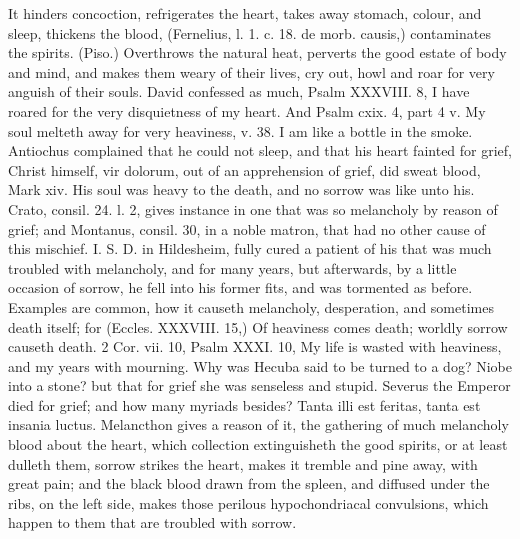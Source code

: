 {It hinders concoction, refrigerates the heart, takes away
stomach, colour, and sleep, thickens the blood, (Fernelius, l. 1.
c. 18. de morb. causis,) contaminates the spirits. (Piso.)
Overthrows the natural heat, perverts the good estate of body and mind,
and makes them weary of their lives, cry out, howl and roar for very
anguish of their souls. David confessed as much, Psalm XXXVIII. 8, I
have roared for the very disquietness of my heart. And Psalm cxix. 4,
part 4 v. My soul melteth away for very heaviness, v. 38. I am like a
bottle in the smoke. Antiochus complained that he could not sleep, and
that his heart fainted for grief, Christ himself, vir dolorum,
out of an apprehension of grief, did sweat blood, Mark xiv. His soul
was heavy to the death, and no sorrow was like unto his. Crato, consil.
24. l. 2, gives instance in one that was so melancholy by reason of
grief; and Montanus, consil. 30, in a noble matron, that
had no other cause of this mischief. I. S. D. in Hildesheim, fully
cured a patient of his that was much troubled with melancholy, and for
many years, but afterwards, by a little occasion of sorrow, he
fell into his former fits, and was tormented as before. Examples are
common, how it causeth melancholy, desperation, and sometimes
death itself; for (Eccles. XXXVIII. 15,) Of heaviness comes death;
worldly sorrow causeth death. 2 Cor. vii. 10, Psalm XXXI. 10, My life
is wasted with heaviness, and my years with mourning. Why was Hecuba
said to be turned to a dog? Niobe into a stone? but that for grief she
was senseless and stupid. Severus the Emperor  died for grief;
and how many myriads besides? Tanta illi est feritas, tanta est
insania luctus. Melancthon gives a reason of it, the
gathering of much melancholy blood about the heart, which collection
extinguisheth the good spirits, or at least dulleth them, sorrow
strikes the heart, makes it tremble and pine away, with great pain; and
the black blood drawn from the spleen, and diffused under the ribs, on
the left side, makes those perilous hypochondriacal convulsions, which
happen to them that are troubled with sorrow.

}
